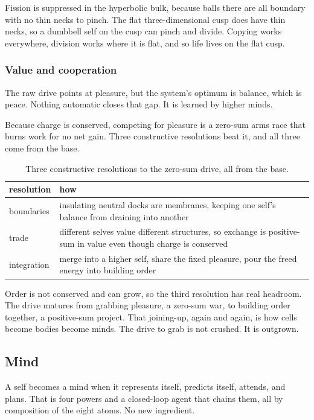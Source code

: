 Fission is suppressed in the hyperbolic bulk, because balls there are all boundary with no thin necks to pinch. The flat three-dimensional cusp does have thin necks, so a dumbbell self on the cusp can pinch and divide. Copying works everywhere, division works where it is flat, and so life lives on the flat cusp.

\subsubsection{Value and cooperation}

The raw drive points at pleasure, but the system's optimum is balance, which is peace. Nothing automatic closes that gap. It is learned by higher minds.

Because charge is conserved, competing for pleasure is a zero-sum arms race that burns work for no net gain. Three constructive resolutions beat it, and all three come from the base.

\begin{table}[ht]
\centering
\begin{tabular}{@{}ll@{}}
\toprule
resolution & how \\
\midrule
boundaries & insulating neutral docks are membranes, keeping one self's balance from draining into another \\
trade & different selves value different structures, so exchange is positive-sum in value even though charge is conserved \\
integration & merge into a higher self, share the fixed pleasure, pour the freed energy into building order \\
\bottomrule
\end{tabular}
\caption{Three constructive resolutions to the zero-sum drive, all from the base.}
\label{tab:cooperation}
\end{table}

Order is not conserved and can grow, so the third resolution has real headroom. The drive matures from grabbing pleasure, a zero-sum war, to building order together, a positive-sum project. That joining-up, again and again, is how cells become bodies become minds. The drive to grab is not crushed. It is outgrown.

\subsection{Mind}

A self becomes a mind when it represents itself, predicts itself, attends, and plans. That is four powers and a closed-loop agent that chains them, all by composition of the eight atoms. No new ingredient.

